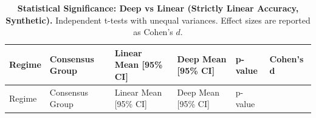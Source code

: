 \documentclass[
  letterpaper,
]{report}
\begin{document}
\begin{longtable}[]{@{}
  >{\raggedright\arraybackslash}p{}
  >{\raggedright\arraybackslash}p{}
  >{\raggedright\arraybackslash}p{}
  >{\raggedright\arraybackslash}p{}
  >{\raggedleft\arraybackslash}p{}
  >{\raggedleft\arraybackslash}p{}@{}}
\caption{\textbf{Statistical Significance: Deep vs Linear (Strictly
Linear Accuracy, Synthetic).} Independent t-tests with unequal
variances. Effect sizes are reported as Cohen's
\(d\).}\label{tbl-stat-sig-synthetic}\tabularnewline
\toprule\noalign{}
\begin{minipage}[b]{\linewidth}\raggedright
Regime
\end{minipage} & \begin{minipage}[b]{\linewidth}\raggedright
Consensus Group
\end{minipage} & \begin{minipage}[b]{\linewidth}\raggedright
Linear Mean {[}95\% CI{]}
\end{minipage} & \begin{minipage}[b]{\linewidth}\raggedright
Deep Mean {[}95\% CI{]}
\end{minipage} & \begin{minipage}[b]{\linewidth}\raggedleft
p-value
\end{minipage} & \begin{minipage}[b]{\linewidth}\raggedleft
Cohen's d
\end{minipage} \\
\midrule\noalign{}
\endfirsthead
\toprule\noalign{}
\begin{minipage}[b]{\linewidth}\raggedright
Regime
\end{minipage} & \begin{minipage}[b]{\linewidth}\raggedright
Consensus Group
\end{minipage} & \begin{minipage}[b]{\linewidth}\raggedright
Linear Mean {[}95\% CI{]}
\end{minipage} & \begin{minipage}[b]{\linewidth}\raggedright
Deep Mean {[}95\% CI{]}
\end{minipage} & \begin{minipage}[b]{\linewidth}\raggedleft
p-value
\end{minipage} & \begin{minipage}[b]{\linewidth}\raggedleft

\end{minipage}
\end{longtable}
\end{document}
